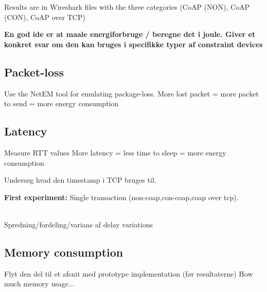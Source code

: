 Results are in Wireshark files with the three categories (CoAP (NON), CoAP (CON), CoAP over TCP)

\textbf{En god ide er at maale energiforbruge / beregne det i joule. Giver et konkret svar om den kan bruges i specifikke typer af constraint devices}

\subsection{Packet-loss}
Use the NetEM tool for emulating package-loss.
More lost packet = more packet to send = more energy consumption

\subsection{Latency}
Measure RTT values %
More latency = less time to sleep = more energy consumption

Undersøg hvad den timestamp i TCP bruges til.

\textbf{First experiment:} Single transaction (non-coap,con-coap,coap over tcp).
\\ \\
Spredning/fordeling/varians af delay variations 

\subsection{Memory consumption}
Flyt den del til et afsnit med prototype implementation (før resultaterne)
How much memory usage...


